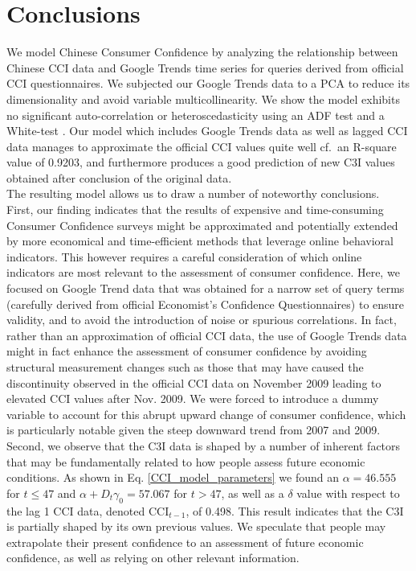 \documentclass[10pt]{article}
\begin{document}
\section*{Conclusions}
We model Chinese Consumer Confidence by analyzing the relationship between Chinese CCI data and Google Trends time series for queries derived from official CCI questionnaires. We subjected our Google Trends data to a PCA to reduce its dimensionality and avoid variable multicollinearity. We show the model exhibits no significant auto-correlation or heteroscedasticity using an ADF test and a White-test \cite{White1980}. Our model which includes Google Trends data as well as lagged CCI data manages to approximate the official CCI values quite well cf.~an R-square value of 0.9203, and furthermore produces a good prediction of new C3I values obtained after conclusion of the original data.\\

The resulting model allows us to draw a number of noteworthy conclusions.\\

First, our finding indicates that the results of expensive and time-consuming Consumer Confidence surveys might be approximated and potentially extended by more economical and time-efficient methods that leverage online behavioral indicators. This however requires a careful consideration of which online indicators are most relevant to the assessment of consumer confidence. Here, we focused on Google Trend data that was obtained for a narrow set of query terms (carefully derived from official Economist's Confidence Questionnaires) to ensure validity, and to avoid the introduction of noise or spurious correlations. In fact, rather than an approximation of official CCI data, the use of Google Trends data might in fact enhance the assessment of consumer confidence by avoiding structural measurement changes such as those that may have caused the discontinuity observed in the official CCI data on November 2009 leading to elevated CCI values after Nov. 2009. We were forced to introduce a dummy variable to account for this abrupt upward change of consumer confidence, which is particularly notable given the steep downward trend from 2007 and 2009.\\

Second, we observe that the C3I data is shaped by a number of inherent factors that may be fundamentally related to how people assess future economic conditions. As shown in Eq. \ref{CCI_model_parameters} we found an $\alpha=46.555$ for $t \leq 47$ and 
$\alpha + D_t \gamma_0=57.067$ for $t > 47$, as well as a $\delta$ value with respect to the lag 1 CCI data, denoted $\mbox{CCI}_{t-1}$, of 0.498. This result indicates that the C3I is partially shaped by its own previous values. We speculate that people may extrapolate their present confidence to an assessment of future economic confidence, as well as relying on other relevant information.\\
\end{document}
